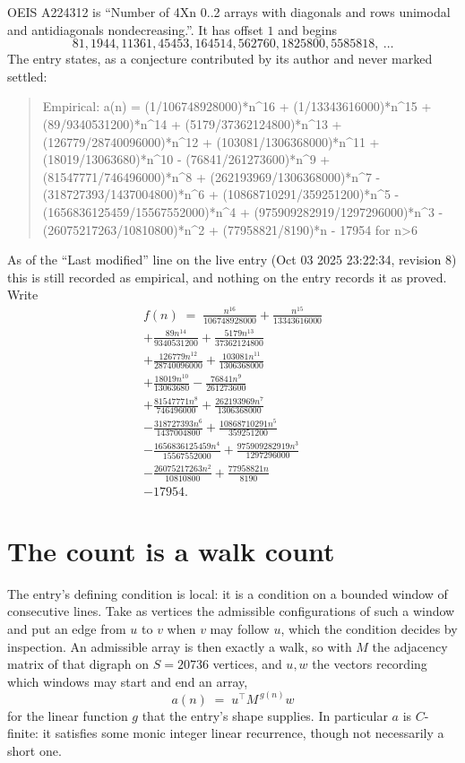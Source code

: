 \documentclass[11pt,a4paper]{article}
\theoremstyle{plain}
\theoremstyle{definition}
\begin{document}
OEIS A224312 is ``Number of 4Xn 0..2 arrays with diagonals and rows unimodal and antidiagonals nondecreasing.''. It has offset $1$ and begins
\[
81, 1944, 11361, 45453, 164514, 562760, 1825800, 5585818,\ \dots
\]
The entry states, as a conjecture contributed by its author and never marked settled:
\begin{quote}\raggedright\small
Empirical: a(n) = (1/106748928000)*n\^{}16 + (1/13343616000)*n\^{}15 + (89/9340531200)*n\^{}14 + (5179/37362124800)*n\^{}13 + (126779/28740096000)*n\^{}12 + (103081/1306368000)*n\^{}11 + (18019/13063680)*n\^{}10 - (76841/261273600)*n\^{}9 + (81547771/746496000)*n\^{}8 + (262193969/1306368000)*n\^{}7 - (318727393/1437004800)*n\^{}6 + (10868710291/359251200)*n\^{}5 - (1656836125459/15567552000)*n\^{}4 + (975909282919/1297296000)*n\^{}3 - (26075217263/10810800)*n\^{}2 + (77958821/8190)*n - 17954 for n>6
\end{quote}
As of the ``Last modified'' line on the live entry (Oct 03 2025 23:22:34, revision 8) this is still
recorded as empirical, and nothing on the entry records it as proved. Write
\begin{multline*}
f(n)\;=\;\frac{n^{16}}{106748928000} + \frac{n^{15}}{13343616000} \\
+ \frac{89 n^{14}}{9340531200} + \frac{5179 n^{13}}{37362124800} \\
+ \frac{126779 n^{12}}{28740096000} + \frac{103081 n^{11}}{1306368000} \\
+ \frac{18019 n^{10}}{13063680} - \frac{76841 n^{9}}{261273600} \\
+ \frac{81547771 n^{8}}{746496000} + \frac{262193969 n^{7}}{1306368000} \\
- \frac{318727393 n^{6}}{1437004800} + \frac{10868710291 n^{5}}{359251200} \\
- \frac{1656836125459 n^{4}}{15567552000} + \frac{975909282919 n^{3}}{1297296000} \\
- \frac{26075217263 n^{2}}{10810800} + \frac{77958821 n}{8190} \\
- 17954.
\end{multline*}

\section{The count is a walk count}

The entry's defining condition is local: it is a condition on a bounded window of consecutive lines. Take as vertices the
admissible configurations of such a window and put an edge from $u$ to $v$ when $v$ may
follow $u$, which the condition decides by inspection. An admissible array is then exactly a
walk, so with $M$ the adjacency matrix of that digraph on $S=20736$ vertices, and $u,w$ the
vectors recording which windows may start and end an array,
\[
a(n)\;=\;u^{\!\top}M^{\,g(n)}w
\]
for the linear function $g$ that the entry's shape supplies. In particular $a$ is
$C$-finite: it satisfies some monic integer linear recurrence, though not necessarily a short
one.
\end{document}
